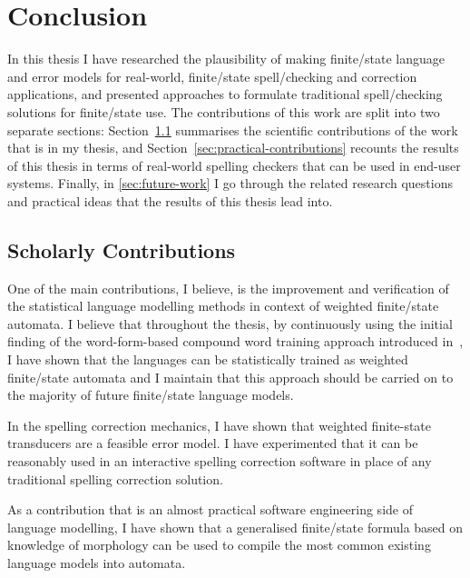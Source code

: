 \documentclass[officiallayout]{unihelcompling}
\begin{document}
\chapter{Conclusion}
\label{chap:conclusion}

In this thesis I have researched the plausibility of making finite\-/state
language and error models for real-world, finite\-/state spell\-/checking and
correction applications, and presented approaches to formulate traditional
spell\-/checking solutions for finite\-/state use. The contributions of this
work are split into two separate sections:
Section~\ref{sec:scholarly-contributions} summarises the scientific
contributions of the work that is in my thesis, and
Section~\ref{sec:practical-contributions} recounts the results of this thesis
in terms of real-world spelling checkers that can be used in end-user systems.
Finally, in \ref{sec:future-work} I go through the related research questions
and practical ideas that the results of this thesis lead into.

\section{Scholarly Contributions}
\label{sec:scholarly-contributions}

One of the main contributions, I believe, is the improvement and verification
of the statistical language modelling methods in context of weighted
finite\-/state automata. I believe that throughout the thesis, by continuously
using the initial finding of the word-form-based compound word training
approach introduced in~, I have shown that the
 languages can be
statistically trained as weighted finite\-/state automata and I maintain that
this approach should be carried on to the majority of future finite\-/state
language models.

In the spelling correction mechanics, I have shown that weighted finite-state
transducers are a feasible error model. I have experimented that it can be
reasonably used in an interactive spelling correction software in place of any
traditional spelling correction solution.


As a contribution that is an almost practical software engineering side of
language modelling, I have shown that a generalised finite\-/state formula
based on knowledge of morphology can be used to compile the most common
existing language models into automata.
\end{document}
